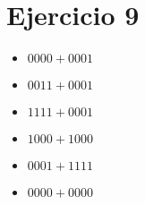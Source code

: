 \section*{Ejercicio 9}

\begin{itemize}
    \item $ 0000 + 0001 $
    \item $ 0011 + 0001 $
    \item $ 1111 + 0001 $
    \item $ 1000 + 1000 $
    \item $ 0001 + 1111 $
    \item $ 0000 + 0000 $
\end{itemize}
